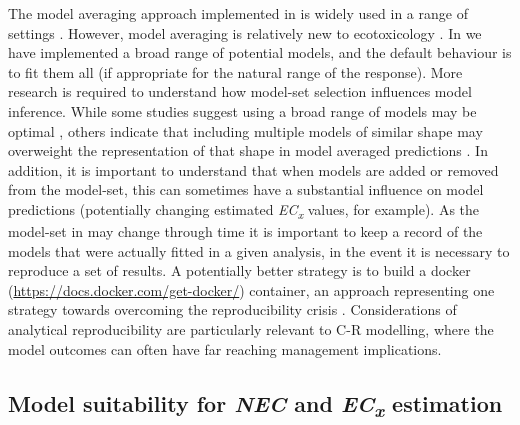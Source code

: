 \documentclass[
  shortnames]{jss}
\begin{document}
The model averaging approach implemented in  is widely used in a range of settings \citep[in ecology for example, see][ for a thorough review]{Dormann2018}. However, model averaging is relatively new to ecotoxicology \citep[but see, for example,][]{Shao2014, Thorley2018, fox2020, Wheeler2009}. In  we have implemented a broad range of potential models, and the default behaviour is to fit them all (if appropriate for the natural range of the response). More research is required to understand how model-set selection influences model inference. While some studies suggest using a broad range of models may be optimal \citep{Wheeler2009}, others indicate that including multiple models of similar shape may overweight the representation of that shape in model averaged predictions \citep{fox2020}. In addition, it is important to understand that when models are added or removed from the model-set, this can sometimes have a substantial influence on model predictions (potentially changing estimated \emph{EC\textsubscript{x}} values, for example). As the model-set in  may change through time it is important to keep a record of the models that were actually fitted in a given analysis, in the event it is necessary to reproduce a set of results. A potentially better strategy is to build a docker (\url{https://docs.docker.com/get-docker/}) container, an approach representing one strategy towards overcoming the reproducibility crisis \citep{Baker2016}. Considerations of analytical reproducibility are particularly relevant to C-R modelling, where the model outcomes can often have far reaching management implications.

\subsection[Model suitability for NEC and ECx estimation]{Model suitability for \textit{NEC} and \textit{EC\textsubscript{x}} estimation}\label{modsuit}
\end{document}
